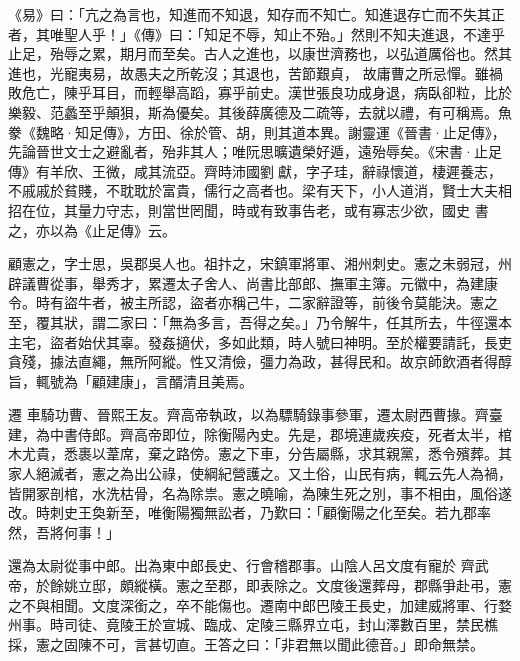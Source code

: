 
\begin{pinyinscope}

 《易》曰：「亢之為言也，知進而不知退，知存而不知亡。知進退存亡而不失其正者，其唯聖人乎！」《傳》曰：「知足不辱，知止不殆。」然則不知夫進退，不達乎止足，殆辱之累，期月而至矣。古人之進也，以康世濟務也，以弘道厲俗也。然其進也，光寵夷易，故愚夫之所乾沒；其退也，苦節艱貞，
 故庸曹之所忌憚。雖禍敗危亡，陳乎耳目，而輕舉高蹈，寡乎前史。漢世張良功成身退，病臥卻粒，比於樂毅、范蠡至乎顛狽，斯為優矣。其後薛廣德及二疏等，去就以禮，有可稱焉。魚豢《魏略·知足傳》，方田、徐於管、胡，則其道本異。謝靈運《晉書·止足傳》，先論晉世文士之避亂者，殆非其人；唯阮思曠遺榮好遁，遠殆辱矣。《宋書·止足傳》有羊欣、王微，咸其流亞。齊時沛國劉獻，字子珪，辭祿懷道，棲遲養志，不戚戚於貧賤，不耽耽於富貴，儒行之高者也。梁有天下，小人道消，賢士大夫相招在位，其量力守志，則當世罔聞，時或有致事告老，或有寡志少欲，國史
 書之，亦以為《止足傳》云。



 顧憲之，字士思，吳郡吳人也。祖抃之，宋鎮軍將軍、湘州刺史。憲之未弱冠，州辟議曹從事，舉秀才，累遷太子舍人、尚書比部郎、撫軍主簿。元徽中，為建康令。時有盜牛者，被主所認，盜者亦稱己牛，二家辭證等，前後令莫能決。憲之至，覆其狀，謂二家曰：「無為多言，吾得之矣。」乃令解牛，任其所去，牛徑還本主宅，盜者始伏其辜。發姦擿伏，多如此類，時人號曰神明。至於權要請託，長吏貪殘，據法直繩，無所阿縱。性又清儉，彊力為政，甚得民和。故京師飲酒者得醇旨，輒號為「顧建康」，言醑清且美焉。



 遷
 車騎功曹、晉熙王友。齊高帝執政，以為驃騎錄事參軍，遷太尉西曹掾。齊臺建，為中書侍郎。齊高帝即位，除衡陽內史。先是，郡境連歲疾疫，死者太半，棺木尤貴，悉裹以葦席，棄之路傍。憲之下車，分告屬縣，求其親黨，悉令殯葬。其家人絕滅者，憲之為出公祿，使綱紀營護之。又土俗，山民有病，輒云先人為禍，皆開冢剖棺，水洗枯骨，名為除祟。憲之曉喻，為陳生死之別，事不相由，風俗遂改。時刺史王奐新至，唯衡陽獨無訟者，乃歎曰：「顧衡陽之化至矣。若九郡率然，吾將何事！」



 還為太尉從事中郎。出為東中郎長史、行會稽郡事。山陰人呂文度有寵於
 齊武帝，於餘姚立邸，頗縱橫。憲之至郡，即表除之。文度後還葬母，郡縣爭赴弔，憲之不與相聞。文度深銜之，卒不能傷也。遷南中郎巴陵王長史，加建威將軍、行婺州事。時司徒、竟陵王於宣城、臨成、定陵三縣界立屯，封山澤數百里，禁民樵採，憲之固陳不可，言甚切直。王答之曰：「非君無以聞此德音。」即命無禁。




\end{pinyinscope}
